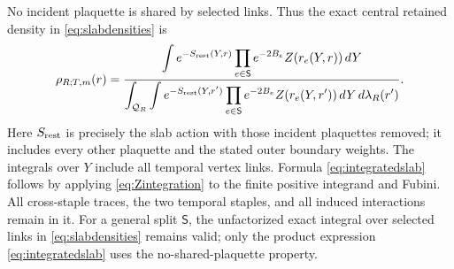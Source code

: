 \documentclass[11pt]{article}
\begin{document}
No incident plaquette is shared by selected links. Thus the exact
central retained density in \eqref{eq:slabdensities} is
\begin{equation}\label{eq:integratedslab}
 \rho_{R;T,m}(r)=
 \frac{\displaystyle\int
    e^{-S_{\rm rest}(Y,r)}
    \prod_{e\in\mathsf S}e^{-2B_e}Z(r_e(Y,r))\,dY}
      {\displaystyle\int_{\mathcal Q_R}\int
    e^{-S_{\rm rest}(Y,r')}
    \prod_{e\in\mathsf S}e^{-2B_e}Z(r_e(Y,r'))\,dY\,d\lambda_R(r')}.
\end{equation}
Here $S_{\rm rest}$ is precisely the slab action with those incident
plaquettes removed; it includes every other plaquette and the stated
outer boundary weights. The integrals over $Y$ include all temporal
vertex links. Formula \eqref{eq:integratedslab} follows by applying
\eqref{eq:Zintegration} to the finite positive integrand and Fubini.
All cross-staple traces, the two temporal staples, and all induced
interactions remain in it. For a general split $\mathsf S$, the
unfactorized exact integral over selected links in
\eqref{eq:slabdensities} remains valid; only the product expression
\eqref{eq:integratedslab} uses the no-shared-plaquette property.
\end{document}
